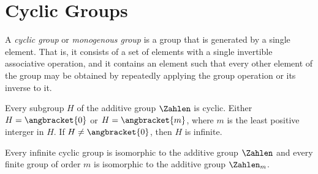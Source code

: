\section{Cyclic Groups}
\begin{Definition}
	A \textit{cyclic group} or \textit{monogenous group} is a group that is generated by a single element. That is, it consists of a set of elements with a single invertible associative operation, and it contains an element such that every other element of the group may be obtained by repeatedly applying the group operation or its inverse to it.
\end{Definition}
\begin{Theorem}
	Every subgroup $ H $ of the additive group $ \Zahlen $ is cyclic. Either $ H = \angbracket{0} $ or $ H = \angbracket{m} $, where $ m $ is the least positive interger in $ H $. If $ H \neq \angbracket{0} $, then $ H $ is infinite.
\end{Theorem}
\begin{Theorem}
	Every infinite cyclic group is isomorphic to the additive group $ \Zahlen $ and every finite group of order $ m $ is isomorphic to the additive group $ \Zahlen_m $.
\end{Theorem}

